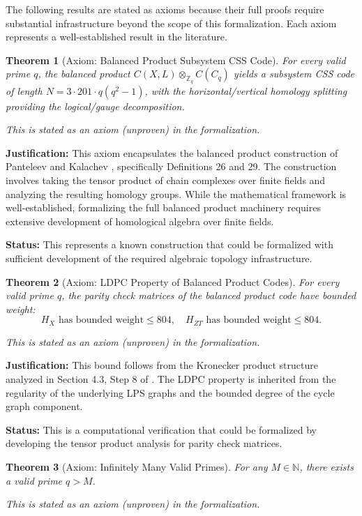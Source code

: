 \documentclass[11pt]{article}
\theoremstyle{plain}
\newtheorem*{theorem}{Theorem}
\theoremstyle{definition}
\theoremstyle{remark}
\begin{document}
The following results are stated as axioms because their full proofs require substantial infrastructure beyond the scope of this formalization. Each axiom represents a well-established result in the literature.

\begin{theorem}[Axiom: Balanced Product Subsystem CSS Code]
For every valid prime $q$, the balanced product $C(X, L) \otimes_{\mathbb{Z}_q} C(C_q)$ yields a subsystem CSS code of length $N = 3 \cdot 201 \cdot q(q^2-1)$, with the horizontal/vertical homology splitting providing the logical/gauge decomposition.

\textit{This is stated as an axiom (unproven) in the formalization.}
\end{theorem}

\textbf{Justification:} This axiom encapsulates the balanced product construction of Panteleev and Kalachev \cite{PK22}, specifically Definitions 26 and 29. The construction involves taking the tensor product of chain complexes over finite fields and analyzing the resulting homology groups. While the mathematical framework is well-established, formalizing the full balanced product machinery requires extensive development of homological algebra over finite fields.

\textbf{Status:} This represents a known construction that could be formalized with sufficient development of the required algebraic topology infrastructure.

\begin{theorem}[Axiom: LDPC Property of Balanced Product Codes]
For every valid prime $q$, the parity check matrices of the balanced product code have bounded weight:
\[
H_X \text{ has bounded weight} \leq 804, \quad H_{ZT} \text{ has bounded weight} \leq 804.
\]

\textit{This is stated as an axiom (unproven) in the formalization.}
\end{theorem}

\textbf{Justification:} This bound follows from the Kronecker product structure analyzed in Section 4.3, Step 8 of \cite{PK22}. The LDPC property is inherited from the regularity of the underlying LPS graphs and the bounded degree of the cycle graph component.

\textbf{Status:} This is a computational verification that could be formalized by developing the tensor product analysis for parity check matrices.

\begin{theorem}[Axiom: Infinitely Many Valid Primes]
For any $M \in \mathbb{N}$, there exists a valid prime $q > M$.

\textit{This is stated as an axiom (unproven) in the formalization.}
\end{theorem}
\end{document}
